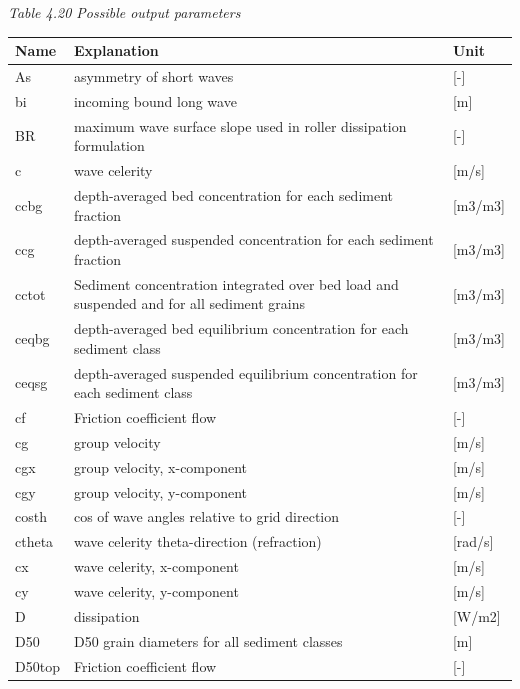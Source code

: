 \documentclass{article}
\begin{document}
\noindent \textit{Table 4.20 Possible output parameters}

\begin{tabular}{|p{0.7in}|p{2.5in}|p{0.9in}|} \hline 
Name & \textbf{Explanation} & \textbf{Unit} \\ \hline 
As & asymmetry of short waves             & [-] \\ \hline 
bi & incoming bound long wave             & [m] \\ \hline 
BR & maximum wave surface slope used in roller dissipation formulation        & [-] \\ \hline 
c & wave celerity               & [m/s] \\ \hline 
ccbg & depth-averaged bed concentration for each sediment fraction          & [m3/m3] \\ \hline 
ccg & depth-averaged suspended concentration for each sediment fraction          & [m3/m3] \\ \hline 
cctot & Sediment concentration integrated over bed load and suspended and for all sediment grains    & [m3/m3] \\ \hline 
ceqbg & depth-averaged bed equilibrium concentration for each sediment class         & [m3/m3] \\ \hline 
ceqsg & depth-averaged suspended equilibrium concentration for each sediment class         & [m3/m3] \\ \hline 
cf & Friction coefficient flow              & [-] \\ \hline 
cg & group velocity               & [m/s] \\ \hline 
cgx & group velocity, x-component              & [m/s] \\ \hline 
cgy & group velocity, y-component              & [m/s] \\ \hline 
costh & cos of wave angles relative to grid direction         & [-] \\ \hline 
ctheta & wave celerity theta-direction (refraction)             & [rad/s] \\ \hline 
cx & wave celerity, x-component              & [m/s] \\ \hline 
cy & wave celerity, y-component              & [m/s] \\ \hline 
D & dissipation                & [W/m2] \\ \hline 
D50 & D50 grain diameters for all sediment classes          & [m] \\ \hline 
D50top & Friction coefficient flow              & [-] \\ \hline 

\end{tabular}
\end{document}
